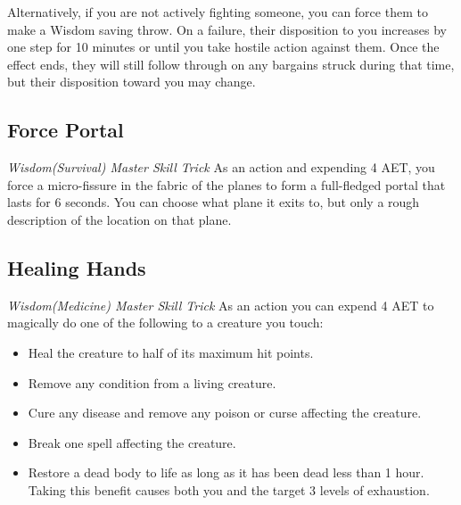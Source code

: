 Alternatively, if you are not actively fighting someone, you can force them to make a Wisdom saving throw. On a failure, their disposition to you increases by one step for 10 minutes or until you take hostile action against them. Once the effect ends, they will still follow through on any bargains struck during that time, but their disposition toward you may change.

\subsection{Force Portal}
\textit{Wisdom(Survival) Master Skill Trick}
As an action and expending 4 AET, you force a micro-fissure in the fabric of the planes to form a full-fledged portal that lasts for 6 seconds. You can choose what plane it exits to, but only a rough description of the location on that plane.

\subsection{Healing Hands}
\textit{Wisdom(Medicine) Master Skill Trick}
As an action you can expend 4 AET to magically do one of the following to a creature you touch:
\begin{itemize}
	\item Heal the creature to half of its maximum hit points.
	\item Remove any condition from a living creature.
	\item Cure any disease and remove any poison or curse affecting the creature.
	\item Break one spell affecting the creature.
	\item Restore a dead body to life as long as it has been dead less than 1 hour. Taking this benefit causes both you and the target 3 levels of exhaustion.
\end{itemize}